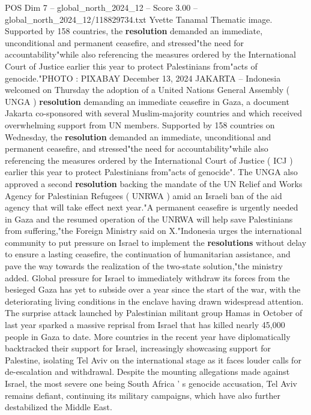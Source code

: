 \begin{textsample}{POS Dim 7 – global\_north\_2024\_12 – Score 3.00 – global\_north\_2024\_12/118829734.txt}  \label{ex:f7_pos_294}
Yvette Tanamal Thematic image.
Supported by 158 countries, the \textbf{resolution} demanded an immediate, unconditional and permanent ceasefire, and stressed"the need for accountability"while also referencing the measures ordered by the International Court of Justice earlier this year to protect Palestinians from"acts of genocide."PHOTO : PIXABAY December 13, 2024 JAKARTA -- Indonesia welcomed on Thursday the adoption of a United Nations General Assembly ( UNGA ) \textbf{resolution} demanding an immediate ceasefire in Gaza, a document Jakarta co-sponsored with several Muslim-majority countries and which received overwhelming support from UN members.
Supported by 158 countries on Wednesday, the \textbf{resolution} demanded an immediate, unconditional and permanent ceasefire, and stressed"the need for accountability"while also referencing the measures ordered by the International Court of Justice ( ICJ ) earlier this year to protect Palestinians from"acts of genocide".
The UNGA also approved a second \textbf{resolution} backing the mandate of the UN Relief and Works Agency for Palestinian Refugees ( UNRWA ) amid an Israeli ban of the aid agency that will take effect next year."A permanent ceasefire is urgently needed in Gaza and the resumed operation of the UNRWA will help save Palestinians from suffering,"the Foreign Ministry said on X."Indonesia urges the international community to put pressure on Israel to implement the \textbf{resolutions} without delay to ensure a lasting ceasefire, the continuation of humanitarian assistance, and pave the way towards the realization of the two-state solution,"the ministry added.
Global pressure for Israel to immediately withdraw its forces from the besieged Gaza has yet to subside over a year since the start of the war, with the deteriorating living conditions in the enclave having drawn widespread attention.
The surprise attack launched by Palestinian militant group Hamas in October of last year sparked a massive reprisal from Israel that has killed nearly 45,000 people in Gaza to date.
More countries in the recent year have diplomatically backtracked their support for Israel, increasingly showcasing support for Palestine, isolating Tel Aviv on the international stage as it faces louder calls for de-escalation and withdrawal.
Despite the mounting allegations made against Israel, the most severe one being South Africa ' s genocide accusation, Tel Aviv remains defiant, continuing its military campaigns, which have also further destabilized the Middle East.

\end{textsample}
